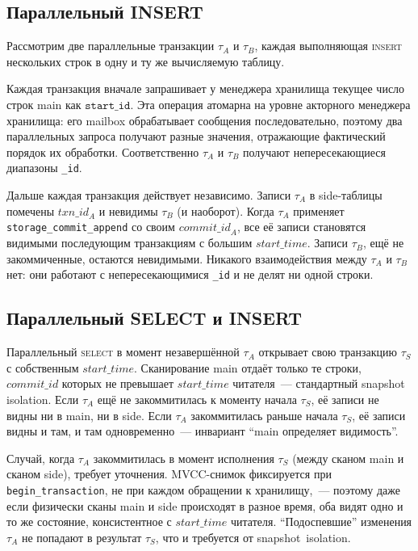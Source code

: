 \subsection{Параллельный INSERT}

Рассмотрим две параллельные транзакции $\tau_A$ и $\tau_B$, каждая
выполняющая \textsc{insert} нескольких строк в одну и ту же
вычисляемую таблицу.

Каждая транзакция вначале запрашивает у менеджера хранилища текущее
число строк main как $\mathtt{start\_id}$. Эта операция атомарна на
уровне акторного менеджера хранилища: его mailbox обрабатывает
сообщения последовательно, поэтому два параллельных запроса
получают разные значения, отражающие фактический порядок их
обработки. Соответственно $\tau_A$ и $\tau_B$ получают
непересекающиеся диапазоны \texttt{\_id}.

Дальше каждая транзакция действует независимо. Записи $\tau_A$ в
side-таблицы помечены $\mathit{txn\_id}_A$ и невидимы $\tau_B$ (и
наоборот). Когда $\tau_A$ применяет \texttt{storage\_commit\_append}
со своим $\mathit{commit\_id}_A$, все её записи становятся видимыми
последующим транзакциям с большим $\mathit{start\_time}$. Записи
$\tau_B$, ещё не закоммиченные, остаются невидимыми. Никакого
взаимодействия между $\tau_A$ и $\tau_B$ нет: они работают с
непересекающимися \texttt{\_id} и не делят ни одной строки.

\subsection{Параллельный SELECT и INSERT}

Параллельный \textsc{select} в момент незавершённой $\tau_A$
открывает свою транзакцию $\tau_S$ с собственным
$\mathit{start\_time}$. Сканирование main отдаёт только те строки,
$\mathit{commit\_id}$ которых не превышает $\mathit{start\_time}$
читателя~--- стандартный snapshot isolation. Если $\tau_A$ ещё не
закоммитилась к моменту начала $\tau_S$, её записи не видны ни в
main, ни в side. Если $\tau_A$ закоммитилась раньше начала
$\tau_S$, её записи видны и там, и там одновременно~--- инвариант
``main определяет видимость''.

Случай, когда $\tau_A$ закоммитилась в момент исполнения $\tau_S$
(между сканом main и сканом side), требует уточнения. MVCC-снимок
фиксируется при \texttt{begin\_transaction}, не при каждом
обращении к хранилищу,~--- поэтому даже если физически сканы main и
side происходят в разное время, оба видят одно и то же состояние,
консистентное с $\mathit{start\_time}$ читателя. ``Подоспевшие''
изменения $\tau_A$ не попадают в результат $\tau_S$, что и требуется
от snapshot~isolation.

